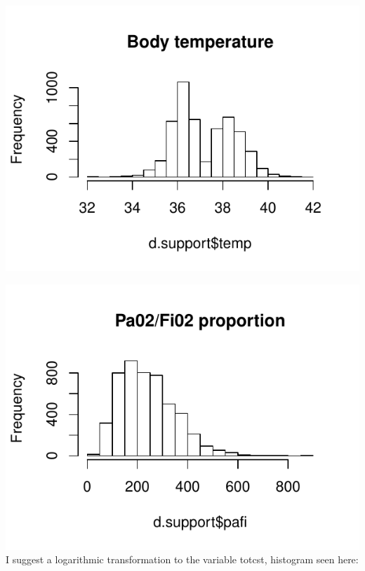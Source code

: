 \documentclass[
]{article}
\newenvironment{Shaded}{\begin{snugshade}}{\end{snugshade}}
\newcommand{\DataTypeTok}[1]{\textcolor[rgb]{0.13,0.29,0.53}{#1}}
\newcommand{\KeywordTok}[1]{\textcolor[rgb]{0.13,0.29,0.53}{\textbf{#1}}}
\newcommand{\NormalTok}[1]{#1}
\newcommand{\OperatorTok}[1]{\textcolor[rgb]{0.81,0.36,0.00}{\textbf{#1}}}
\newcommand{\OtherTok}[1]{\textcolor[rgb]{0.56,0.35,0.01}{#1}}
\newcommand{\StringTok}[1]{\textcolor[rgb]{0.31,0.60,0.02}{#1}}
\begin{document}
\begin{Shaded}
\end{Shaded}

\includegraphics{Eksamensbesvarelse_files/figure-latex/unnamed-chunk-15-9.pdf}

\begin{Shaded}
\end{Shaded}

\includegraphics{Eksamensbesvarelse_files/figure-latex/unnamed-chunk-15-10.pdf}
I suggest a logarithmic transformation to the variable totcst, histogram
seen here:
\end{document}
